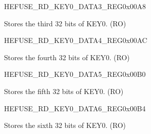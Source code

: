 \begin{register}{H}{EFUSE\_RD\_KEY0\_DATA3\_REG}{0x00A8}\label{regdesc:EFUSERDKEY0DATA3REG}
%
\regnewline%
\begin{regdesc}\begin{reglist}
\label{fielddesc:EFUSEKEY0DATA3}\item [EFUSE\_KEY0\_DATA3] Stores the third 32 bits of KEY0. (RO)
\end{reglist}\end{regdesc}
\end{register}


\begin{register}{H}{EFUSE\_RD\_KEY0\_DATA4\_REG}{0x00AC}\label{regdesc:EFUSERDKEY0DATA4REG}
%
\regnewline%
\begin{regdesc}\begin{reglist}
\label{fielddesc:EFUSEKEY0DATA4}\item [EFUSE\_KEY0\_DATA4] Stores the fourth 32 bits of KEY0. (RO)
\end{reglist}\end{regdesc}
\end{register}


\begin{register}{H}{EFUSE\_RD\_KEY0\_DATA5\_REG}{0x00B0}\label{regdesc:EFUSERDKEY0DATA5REG}
%
\regnewline%
\begin{regdesc}\begin{reglist}
\label{fielddesc:EFUSEKEY0DATA5}\item [EFUSE\_KEY0\_DATA5] Stores the fifth 32 bits of KEY0. (RO)
\end{reglist}\end{regdesc}
\end{register}


\begin{register}{H}{EFUSE\_RD\_KEY0\_DATA6\_REG}{0x00B4}\label{regdesc:EFUSERDKEY0DATA6REG}
%
\regnewline%
\begin{regdesc}\begin{reglist}
\label{fielddesc:EFUSEKEY0DATA6}\item [EFUSE\_KEY0\_DATA6] Stores the sixth 32 bits of KEY0. (RO)
\end{reglist}\end{regdesc}
\end{register}


